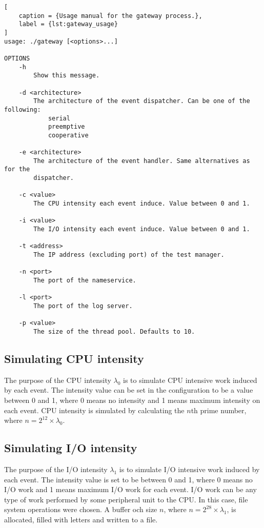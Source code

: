 \begin{lstlisting}[
    caption = {Usage manual for the gateway process.},
    label = {lst:gateway_usage}
]
usage: ./gateway [<options>...]

OPTIONS
    -h
        Show this message.

    -d <architecture>
        The architecture of the event dispatcher. Can be one of the following:
            serial
            preemptive
            cooperative

    -e <architecture>
        The architecture of the event handler. Same alternatives as for the
        dispatcher.

    -c <value>
        The CPU intensity each event induce. Value between 0 and 1.

    -i <value>
        The I/O intensity each event induce. Value between 0 and 1.

    -t <address>
        The IP address (excluding port) of the test manager.

    -n <port>
        The port of the nameservice.

    -l <port>
        The port of the log server.

    -p <value>
        The size of the thread pool. Defaults to 10.
\end{lstlisting}

\subsection{Simulating CPU intensity}

The purpose of the CPU intensity $\lambda_0$ is to simulate CPU intensive work
induced by each event. The intensity value can be set in the configuration to
be a value between 0 and 1, where 0 means no intensity and 1 means maximum
intensity on each event. CPU intensity is simulated by calculating the $n$th
prime number, where $n = 2^{12} \times \lambda_0$.

\subsection{Simulating I/O intensity}

The purpose of the I/O intensity $\lambda_1$ is to simulate I/O intensive work
induced by each event. The intensity value is set to be between 0 and 1, where
0 means no I/O work and 1 means maximum I/O work for each event. I/O work can
be any type of work performed by some peripheral unit to the CPU. In this case,
file system operations were chosen. A buffer och size $n$, where $n = 2^{28}
\times \lambda_1$, is allocated, filled with letters and written to a file.

